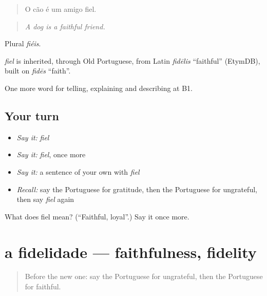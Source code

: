 \begin{quote}
O cão é um amigo fiel.
\end{quote}

\begin{quote}
\emph{A dog is a faithful friend.}
\end{quote}

Plural \emph{fiéis}.

\begin{cousinweb}
\emph{fiel} is inherited, through Old Portuguese, from Latin \emph{fidēlis} \textquotedblleft{}faithful\textquotedblright{} (EtymDB), built on \emph{fidēs} \textquotedblleft{}faith\textquotedblright{}.
\end{cousinweb}

\begin{grammarlens}[title={What you've built}]
One more word for telling, explaining and describing at B1.
\end{grammarlens}

\subsection*{Your turn}
\begin{itemize}
\raggedright
  \item \emph{Say it:} \emph{fiel}
  \item \emph{Say it:} \emph{fiel}, once more
  \item \emph{Say it:} a sentence of your own with \emph{fiel}
  \item \emph{Recall:} say the Portuguese for gratitude, then the Portuguese for ungrateful, then say \emph{fiel} again
\end{itemize}

\begin{tcolorbox}[breakable,colback=teal!4,colframe=teal!35!black,title={Before you move on}]
What does fiel mean? (\textquotedblleft{}Faithful, loyal\textquotedblright{}.) Say it once more.
\end{tcolorbox}
\section[a fidelidade]{a fidelidade — faithfulness, fidelity}

\label{lesson:PT-C499-fidelidade}



\begin{quote}
Before the new one: say the Portuguese for ungrateful, then the Portuguese for faithful.
\end{quote}

